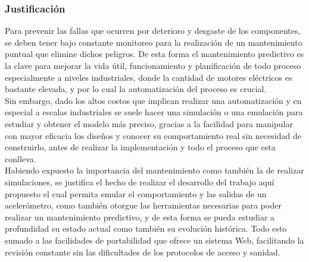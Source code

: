 
\subsubsection{Justificación}

Para prevenir las fallas que ocurren por deterioro y desgaste de los componentes, se deben tener bajo constante monitoreo para la realización de un mantenimiento puntual que elimine dichos peligros. De esta forma el mantenimiento predictivo es la clave para mejorar la vida útil, funcionamiento y planificación de todo proceso especialmente a niveles industriales, donde la cantidad de motores eléctricos es bastante elevada, y por lo cual la automatización del proceso es crucial.\\


Sin embargo, dado los altos costos que implican realizar una automatización y en especial a escalas industriales se suele hacer una simulación o una emulación para estudiar y obtener el modelo más preciso, gracias a la facilidad para manipular con mayor eficacia los diseños y conocer su comportamiento real sin necesidad de construirlo, antes de realizar la implementación y todo el proceso que esta conlleva.\\


Habiendo expuesto la importancia del mantenimiento como también la de realizar simulaciones, se justifica el hecho de realizar el desarrollo del trabajo aquí propuesto el cual permita emular el comportamiento y las salidas de un acelerómetro, como también otorgue las herramientas necesarias para poder realizar un mantenimiento predictivo, y de esta forma se pueda estudiar a profundidad su estado actual como también su evolución histórica. Todo esto sumado a las facilidades de portabilidad que ofrece un sistema Web, facilitando la revisión constante sin las dificultades de los protocolos de acceso y sanidad.\\